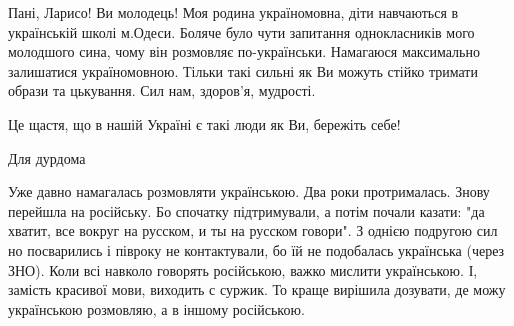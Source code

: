 \begin{itemize}
 

Пані, Ларисо! Ви молодець! Моя родина україномовна, діти навчаються в
українській школі м.Одеси. Боляче було чути запитання однокласників мого
молодшого сина, чому він розмовляє по-українськи. Намагаюся максимально
залишатися україномовною. Тільки такі сильні як Ви можуть стійко тримати образи
та цькування. Сил нам, здоров'я, мудрості.


 
Це щастя, що в нашій Україні є такі люди як Ви, бережіть себе!

\begin{itemize}
 
Для дурдома
\end{itemize}

 

Уже давно намагалась розмовляти українською. Два роки протрималась. Знову
перейшла на російську. Бо спочатку підтримували, а потім почали казати: "да
хватит, все вокруг на русском, и ты на русском говори". З однією подругою сил
но посварились і півроку не контактували, бо їй не подобалась українська (через
ЗНО). Коли всі навколо говорять російською, важко мислити українською. І,
замість красивої мови, виходить с суржик. То краще вирішила дозувати, де можу
українською розмовляю, а в іншому російською.

\begin{itemize}
 

\end{itemize}
\end{itemize}
